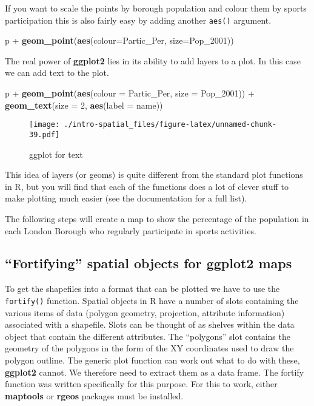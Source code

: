 \documentclass[]{article}
\newenvironment{Shaded}{}{}
\newcommand{\KeywordTok}[1]{\textcolor[rgb]{0.00,0.44,0.13}{\textbf{{#1}}}}
\newcommand{\DataTypeTok}[1]{\textcolor[rgb]{0.56,0.13,0.00}{{#1}}}
\newcommand{\DecValTok}[1]{\textcolor[rgb]{0.25,0.63,0.44}{{#1}}}
\newcommand{\StringTok}[1]{\textcolor[rgb]{0.25,0.44,0.63}{{#1}}}
\newcommand{\NormalTok}[1]{{#1}}
\begin{document}
If you want to scale the points by borough population and colour them by
sports participation this is also fairly easy by adding another
\texttt{aes()} argument.

\begin{Shaded}
\begin{Highlighting}[]
\NormalTok{p +}\StringTok{ }\KeywordTok{geom_point}\NormalTok{(}\KeywordTok{aes}\NormalTok{(}\DataTypeTok{colour=}\NormalTok{Partic_Per, }\DataTypeTok{size=}\NormalTok{Pop_2001))}
\end{Highlighting}
\end{Shaded}

The real power of \textbf{ggplot2} lies in its ability to add layers to
a plot. In this case we can add text to the plot.

\begin{Shaded}
\begin{Highlighting}[]
\NormalTok{p +}\StringTok{ }\KeywordTok{geom_point}\NormalTok{(}\KeywordTok{aes}\NormalTok{(}\DataTypeTok{colour =} \NormalTok{Partic_Per, }\DataTypeTok{size =} \NormalTok{Pop_2001)) +}\StringTok{ }\KeywordTok{geom_text}\NormalTok{(}\DataTypeTok{size =} \DecValTok{2}\NormalTok{, }\KeywordTok{aes}\NormalTok{(}\DataTypeTok{label =} \NormalTok{name))}
\end{Highlighting}
\end{Shaded}

\begin{figure}[htbp]
\centering
\texttt{[image: ./intro-spatial\_files/figure-latex/unnamed-chunk-39.pdf]}
\caption{ggplot for text}
\end{figure}

This idea of layers (or geoms) is quite different from the standard plot
functions in R, but you will find that each of the functions does a lot
of clever stuff to make plotting much easier (see the documentation for
a full list).

The following steps will create a map to show the percentage of the
population in each London Borough who regularly participate in sports
activities.

\subsection{``Fortifying'' spatial objects for ggplot2
maps}\label{fortifying-spatial-objects-for-ggplot2-maps}

To get the shapefiles into a format that can be plotted we have to use
the \texttt{fortify()} function. Spatial objects in R have a number of
slots containing the various items of data (polygon geometry,
projection, attribute information) associated with a shapefile. Slots
can be thought of as shelves within the data object that contain the
different attributes. The ``polygons'' slot contains the geometry of the
polygons in the form of the XY coordinates used to draw the polygon
outline. The generic plot function can work out what to do with these,
\textbf{ggplot2} cannot. We therefore need to extract them as a data
frame. The fortify function was written specifically for this purpose.
For this to work, either \textbf{maptools} or \textbf{rgeos} packages
must be installed.
\end{document}
